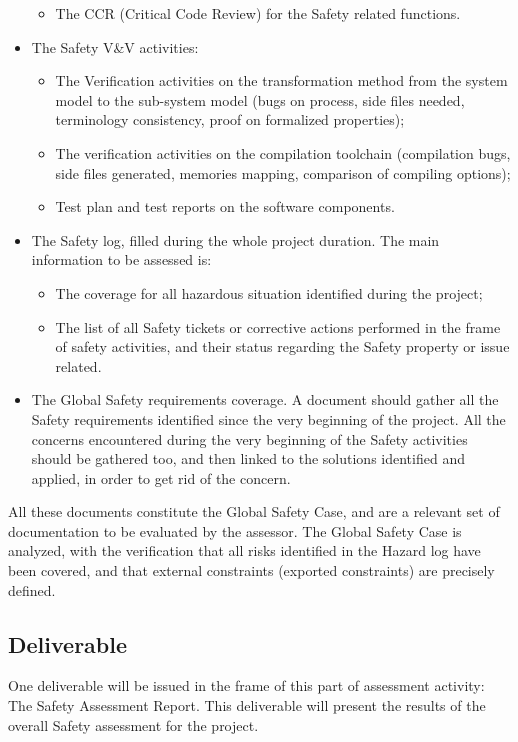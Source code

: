 \documentclass[openetcs]{template/openetcs_article}
\begin{document}
\begin{itemize}
\begin{itemize}
	\item The CCR (Critical Code Review) for the Safety related functions.
	\end{itemize}
\item The Safety V\&V activities:
	\begin{itemize}
\item The Verification activities on the transformation method from the system model to the sub-system model (bugs on process, side files needed, terminology
consistency, proof on formalized properties);
	\item The verification activities on the compilation toolchain (compilation bugs, side files generated, memories mapping, comparison of compiling options);
	\item Test plan and test reports on the software components.
	\end{itemize}
\item The Safety log, filled during the whole project duration. The main information to be assessed is:
	\begin{itemize}
	\item The coverage for all hazardous situation identified during the project;
\item The list of all Safety tickets or corrective actions performed in the frame of safety activities, and their status regarding the Safety property or issue
related.
	\end{itemize}
\item The Global Safety requirements coverage. A document should gather all the Safety requirements identified since the very beginning of the project. All
the concerns encountered during the very beginning of the Safety activities should be gathered too, and then linked to the solutions identified and applied, in
order to get rid of the concern.
\end{itemize}

All these documents constitute the Global Safety Case, and are a relevant set of documentation to be evaluated by the assessor. The Global Safety Case is
analyzed, with the verification that all risks identified in the Hazard log have been covered, and that external constraints (exported constraints) are
precisely defined.



\subsection{Deliverable}
\label{section:deliverable}
One deliverable will be issued in the frame of this part of assessment activity: The Safety Assessment Report. This deliverable will present the
results of the overall Safety assessment for the project.
\end{document}
